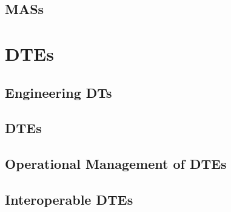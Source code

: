 \documentclass[12pt,a4paper,openright,twoside]{book}
\begin{document}



\chapter{\aclp{MAS}}
\label{chap:back:MAS}



\part{\aclp{DTE}}
\label{part:dte}

\chapter{Engineering \aclp{DT}}
\label{chap:dte:egineering-dt}



\chapter{\aclp{DTE}}
\label{chap:dte:dte}



\chapter{Operational Management of \aclp{DTE}}
\label{chap:dte:dtc}




\chapter{Interoperable \aclp{DTE}}
\label{chap:dte:hwodt}
\end{document}
